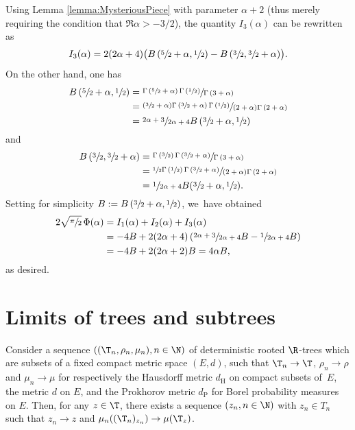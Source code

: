Using Lemma \ref{lemma:MysteriousPiece} with parameter $\alpha+2$ (thus merely requiring the condition that $\Re \alpha > -3/2$), the quantity $I_3(\alpha)$ can be rewritten as
\[
I_3(\alpha) = 2(2\alpha+4) \bigl(B\left(\sfrac{5}{2}+\alpha, \sfrac{1}{2} \right) -B\left(\sfrac{3}{2}, \sfrac{3}{2}+\alpha\right) \bigr).
\]
On the other hand, one has
\begin{align*}
B\left(\sfrac{5}{2}+\alpha, \sfrac{1}{2} \right) &= \sfrac{\Gamma\left(\sfrac{5}{2}+\alpha\right) \Gamma\left(\sfrac{1}{2} \right)}{\Gamma\left(3+\alpha\right)} \\
&= \sfrac{(\sfrac{3}{2}+\alpha) \Gamma\left(\sfrac{3}{2}+\alpha\right) \Gamma\left(\sfrac{1}{2} \right)}{(2+\alpha) \Gamma\left(2+\alpha\right)}\\
&= \sfrac{2\alpha+3}{2\alpha+4} B\left(\sfrac{3}{2}+\alpha, \sfrac{1}{2} \right)
\end{align*}
and
\begin{align*}
B\left(\sfrac{3}{2}, \sfrac{3}{2}+\alpha \right) &= \sfrac{\Gamma\left(\sfrac{3}{2} \right) \Gamma\left(\sfrac{3}{2}+\alpha \right)}{\Gamma\left(3+\alpha \right)} \\
&= \sfrac{\sfrac{1}{2}\Gamma\left(\sfrac{1}{2} \right) \Gamma\left(\sfrac{3}{2}+\alpha \right)}{(2+\alpha)\Gamma\left(2+\alpha \right)}\\
&= \sfrac{1}{2\alpha+4} B(\sfrac{3}{2}+\alpha, \sfrac{1}{2}).
\end{align*}
Setting for simplicity $B:=B\left(\sfrac{3}{2}+\alpha, \sfrac{1}{2} \right)$, we~have obtained
\begin{align*}
2\sqrt{\sfrac{\pi}{2}}\,\Phi(\alpha) &= I_1(\alpha) + I_2(\alpha) + I_3(\alpha)\\
&= -4B + 2(2\alpha+4)\left(\sfrac{2\alpha+3}{2\alpha+4}B-\sfrac{1}{2\alpha+4} B \right)\\
&=-4B + 2(2\alpha+2)B =4\alpha B,
\end{align*}
as desired.

\section{Limits of trees and subtrees}

\begin{lem}\label{lemma:annoyingmetricthing}
Consider a sequence $((\T_n,\rho_n,\mu_n),n\in\N)$ of deterministic rooted $\R$\nobreakdash-trees which are subsets of a fixed compact metric space $(E,d)$, such that $\T_n\to \T$, $\rho_n\to \rho$ and $\mu_n\to\mu$ for respectively the Hausdorff metric $d_{\mathrm{H}}$ on compact subsets of~$E$, the metric $d$ on $E$, and the Prokhorov metric $d_{\mathrm{P}}$ for Borel probability measures on $E$.
Then, for any $z\in\T$, there exists a sequence $(z_n,n\in\N)$ with $z_n\in T_n$ such that $z_n\to z$ and $\mu_n((\T_n)_{z_n}) \to \mu(\T_z)$.
\end{lem}

